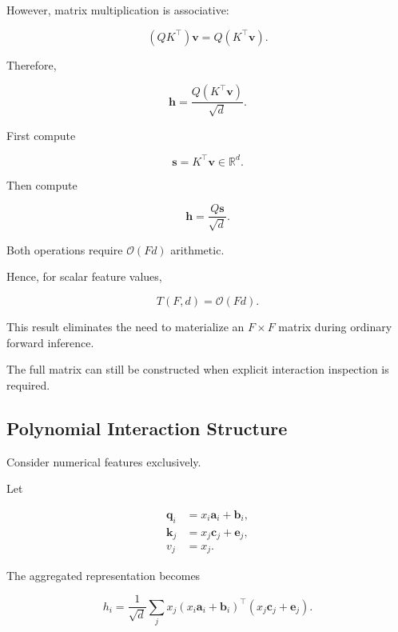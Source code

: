 \documentclass[11pt,a4paper]{article}
\newcommand{\R}{\mathbb{R}}
\begin{document}
However, matrix multiplication is associative:

\begin{equation}
(QK^\top)\mathbf{v}
=
Q(K^\top\mathbf{v}).
\end{equation}

Therefore,

\begin{equation}
\boxed{
\mathbf{h}
=
\frac{Q(K^\top\mathbf{v})}{\sqrt d}.
}
\label{eq:linear_attention}
\end{equation}

First compute

\begin{equation}
\mathbf{s}=K^\top\mathbf{v}
\in\R^d.
\end{equation}

Then compute

\begin{equation}
\mathbf{h}
=
\frac{Q\mathbf{s}}{\sqrt d}.
\end{equation}

Both operations require
$\mathcal{O}(Fd)$ arithmetic.

Hence, for scalar feature values,

\begin{equation}
\boxed{
T(F,d)=\mathcal{O}(Fd).
}
\end{equation}

This result eliminates the need to
materialize an $F\times F$ matrix
during ordinary forward inference.

The full matrix can still be constructed
when explicit interaction inspection
is required.

\subsection{Polynomial Interaction Structure}

Consider numerical features exclusively.

Let

\begin{align}
\mathbf{q}_i
&=
x_i\mathbf{a}_i+\mathbf{b}_i,
\\
\mathbf{k}_j
&=
x_j\mathbf{c}_j+\mathbf{e}_j,
\\
v_j&=x_j.
\end{align}

The aggregated representation becomes

\begin{equation}
h_i
=
\frac{1}{\sqrt d}
\sum_j
x_j
(x_i\mathbf{a}_i+\mathbf{b}_i)^\top
(x_j\mathbf{c}_j+\mathbf{e}_j).
\end{equation}
\end{document}
